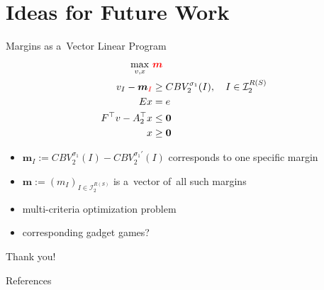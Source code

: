 \documentclass{beamer}
\newcommand{\vect}[1]{\boldsymbol{#1}}
\newcommand{\I}{\mathcal{I}}
\begin{document}
  \section{Ideas for Future Work}

  \begin{frame}{Margins as a~Vector Linear Program}
    \begin{equation*}
      \label{vlp:max-margins}
      \begin{split}
        \max_{v, x}\ &\textcolor{red}{\vect{m}} \\
        v_I - \vect{m}_{\textcolor{red}{I}} &\ge CBV_2^{\sigma_1}(I), \quad I \in \I_2^{R(S)}\\ 
        Ex &= e \\
        F^\top v - A_2^\top x &\le \vect{0} \\
        x &\ge \vect{0}
      \end{split}
    \end{equation*}

    \pause
    \begin{itemize}[<+- | alert@+>]
      \item $\vect{m}_I := CBV_2^{\sigma_1} (I) - CBV_2^{\sigma_1'} (I)$ corresponds to one specific margin
      \item $\vect{m} := (m_I) _{I\in\I_2^{R(S)}}$ is a~vector of~all such margins
      \item multi-criteria optimization problem
      \item corresponding gadget games?
    \end{itemize}
  \end{frame}

  \begin{frame}[standout]
    \begin{center}
      Thank you!
    \end{center}
  \end{frame}

  \begin{frame}[allowframebreaks]{References}
    \tiny
    \printbibliography[heading=none]
  \end{frame}
\end{document}
